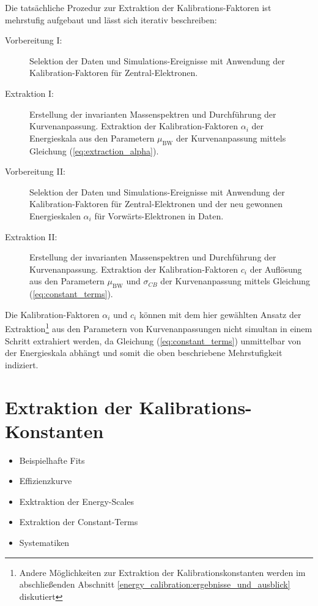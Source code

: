 Die tatsächliche Prozedur zur Extraktion der Kalibrations-Faktoren ist
mehrstufig aufgebaut und lässt sich iterativ beschreiben:
\begin{description}
    \item[Vorbereitung I:]
        Selektion der Daten und Simulations-Ereignisse mit Anwendung der
        Kalibration-Faktoren für Zentral-Elektronen.
    \item[Extraktion I:]
        Erstellung der invarianten Massenspektren und Durchführung der
        Kurvenanpassung. Extraktion der Kalibration-Faktoren $\alpha_i$ der
        Energieskala aus den Parametern $\mu_\text{BW}$ der Kurvenanpassung
        mittels Gleichung (\ref{eq:extraction_alpha}).
    \item[Vorbereitung II:]
        Selektion der Daten und Simulations-Ereignisse mit Anwendung der
        Kalibration-Faktoren für Zentral-Elektronen und der neu gewonnen
        Energieskalen $\alpha_i$ für Vorwärts-Elektronen in Daten.
    \item[Extraktion II:]
        Erstellung der invarianten Massenspektren und Durchführung der
        Kurvenanpassung. Extraktion der Kalibration-Faktoren $c_i$ der
        Auflösung aus den Parametern $\mu_\text{BW}$ und $\sigma_{CB}$ der
        Kurvenanpassung mittels Gleichung (\ref{eq:constant_terms}).
\end{description}
Die Kalibration-Faktoren $\alpha_i$ und $c_i$ können mit dem hier gewählten
Ansatz der Extraktion\footnote{Andere Möglichkeiten zur Extraktion der
Kalibrationskonstanten werden im abschließenden Abschnitt
\ref{energy_calibration:ergebnisse_und_ausblick} diskutiert} aus den Parametern
von Kurvenanpassungen nicht simultan in einem Schritt extrahiert werden, da
Gleichung (\ref{eq:constant_terms}) unmittelbar von der Energieskala abhängt
und somit die oben beschriebene Mehrstufigkeit indiziert.



%
\section{Extraktion der Kalibrations-Konstanten}
\label{energy_calibration:extraktion_der_kalibrations-konstanten}

\begin{itemize}
    \item Beispielhafte Fits
    \item Effizienzkurve
    \item Exktraktion der Energy-Scales
    \item Extraktion der Constant-Terms
    \item Systematiken
\end{itemize}


